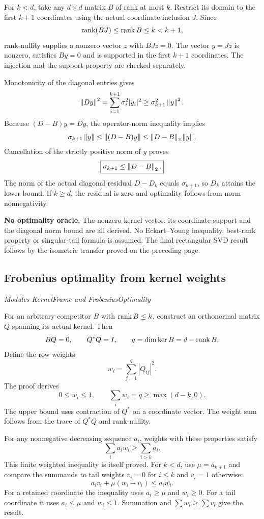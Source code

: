 For $k<d$, take any $d\times d$ matrix $B$ of rank at most $k$. Restrict its domain to the first $k+1$ coordinates using the actual coordinate inclusion $J$. Since
\[
\operatorname{rank}(BJ)\leq\operatorname{rank} B\leq k<k+1,
\]
rank-nullity supplies a nonzero vector $z$ with $BJz=0$. The vector $y=Jz$ is nonzero, satisfies $By=0$ and is supported in the first $k+1$ coordinates. The injection and the support property are checked separately.

Monotonicity of the diagonal entries gives
\[
\left\lVert Dy\right\rVert^{2}
=\sum_{i=1}^{k+1}\sigma_i^{2}|y_i|^{2}
\geq\sigma_{k+1}^{2}\left\lVert y\right\rVert^{2}.
\]
Because $(D-B)y=Dy$, the operator-norm inequality implies
\[
\sigma_{k+1}\left\lVert y\right\rVert
\leq\left\lVert(D-B)y\right\rVert
\leq\left\lVert D-B\right\rVert_2\left\lVert y\right\rVert.
\]
Cancellation of the strictly positive norm of $y$ proves
\[
\boxed{\sigma_{k+1}\leq\left\lVert D-B\right\rVert_2.}
\]
The norm of the actual diagonal residual $D-D_k$ equals $\sigma_{k+1}$, so $D_k$ attains the lower bound. If $k\geq d$, the residual is zero and optimality follows from norm nonnegativity.

\textbf{No optimality oracle.} The nonzero kernel vector, its coordinate support and the diagonal norm bound are all derived. No Eckart--Young inequality, best-rank property or singular-tail formula is assumed. The final rectangular SVD result follows by the isometric transfer proved on the preceding page.



\subsection{Frobenius optimality from kernel weights}\label{supp6:subsection:004}\textit{Modules KernelFrame and FrobeniusOptimality}\par
For an arbitrary competitor $B$ with $\operatorname{rank} B\leq k$, construct an orthonormal matrix $Q$ spanning its actual kernel. Then
\[
BQ=0,\qquad Q^*Q=I,\qquad q=\dim\ker B=d-\operatorname{rank} B.
\]
Define the row weights
\[
w_i=\sum_{j=1}^{q}|Q_{ij}|^2.
\]
The proof derives
\[
\boxed{0\leq w_i\leq1,\qquad \sum_iw_i=q\geq\max(d-k,0).}
\]
The upper bound uses contraction of $Q^*$ on a coordinate vector. The weight sum follows from the trace of $Q^*Q$ and rank-nullity.

For any nonnegative decreasing sequence $a_i$, weights with these properties satisfy
\[
\sum_i a_iw_i\geq\sum_{i>k}a_i.
\]
This finite weighted inequality is itself proved. For $k<d$, use $\mu=a_{k+1}$ and compare the summands to tail weights $v_i=0$ for $i\leq k$ and $v_i=1$ otherwise:
\[
a_iv_i+\mu(w_i-v_i)\leq a_iw_i.
\]
For a retained coordinate the inequality uses $a_i\geq\mu$ and $w_i\geq0$. For a tail coordinate it uses $a_i\leq\mu$ and $w_i\leq1$. Summation and $\sum w_i\geq\sum v_i$ give the result.

